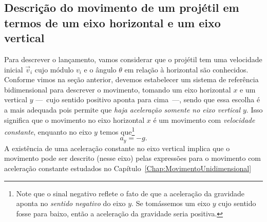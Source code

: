 \subsection{Descrição do movimento de um projétil em termos de um eixo horizontal e um eixo vertical}

%    
% 
%    
% 

Para descrever o lançamento, vamos considerar que o projétil tem uma velocidade inicial $\vec{v}_i$ cujo módulo $v_i$ e o ângulo $\theta$ em relação à horizontal são conhecidos. Conforme vimos na seção anterior, devemos estabelecer um sistema de referência bidimensional para descrever o movimento, tomando um eixo horizontal $x$ e um vertical $y$ ---~cujo sentido positivo aponta para cima~---, sendo que essa escolha é a mais adequada pois permite que \emph{haja aceleração somente no eixo vertical $y$}. Isso significa que o movimento no eixo horizontal $x$ é um movimento com \emph{velocidade constante}, enquanto no eixo $y$ temos que\footnote{Note que o sinal negativo reflete o fato de que a aceleração da gravidade aponta no \emph{sentido negativo} do eixo $y$. Se tomássemos um eixo $y$ cujo sentido fosse para baixo, então a aceleração da gravidade seria positiva.}
\begin{equation}
	a_y = -g.
\end{equation}
%
A existência de uma aceleração constante no eixo vertical implica que o movimento pode ser descrito (nesse eixo) pelas expressões para o movimento com aceleração constante estudados no Capítulo~\ref{Chap:MovimentoUnidimensional}


